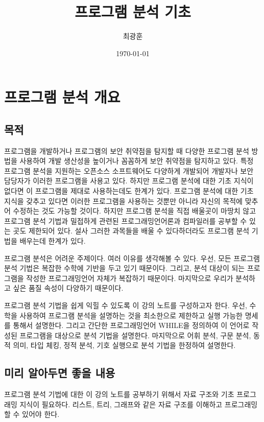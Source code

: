 \documentclass[a4paper]{book}
\title{프로그램 분석 기초}
\author{최광훈}
\date{\today}
\begin{document}
\maketitle

\chapter{프로그램 분석 개요}

\section{목적}

프로그램을 개발하거나 프로그램의 보안 취약점을 탐지할 때 다양한
프로그램 분석 방법을 사용하여 개발 생산성을 높이거나 꼼꼼하게 보안
취약점을 탐지하고 있다.
%
특정 프로그램 분석을 지원하는 오픈소스 소프트웨어도 다양하게 개발되어
개발자나 보안 담당자가 이러한 프로그램을 사용고 있다. 하지만 프로그램
분석에 대한 기초 지식이 없다면 이 프로그램을 제대로 사용하는데도
한계가 있다. 프로그램 분석에 대한 기초 지식을 갖추고 있다면 이러한
프로그램을 사용하는 것뿐만 아니라 자신의 목적에 맞추어 수정하는 것도
가능할 것이다.
%
하지만 프로그램 분석을 직접 배울곳이 마땅치 않고 프로그램 분석 기법과
밀접하게 관련된 프로그래밍언어론과 컴파일러를 공부할 수 있는 곳도
제한되어 있다. 설사 그러한 과목들을 배울 수 있다하더라도 프로그램 분석
기법을 배우는데 한계가 있다.

프로그램 분석은 어려운 주제이다. 여러 이유를 생각해볼 수 있다. 우선,
모든 프로그램 분석 기법은 복잡한 수학에 기반을 두고 있기
때문이다. 그리고, 분석 대상이 되는 프로그램을 작성한 프로그래밍언어
자체가 복잡하기 때문이다. 마지막으로 우리가 분석하고 싶은 품질 속성이
다양하기 때문이다.

프로그램 분석 기법을 쉽게 익힐 수 있도록 이 강의 노트를 구성하고자
한다. 우선, 수학을 사용하여 프로그램 분석을 설명하는 것을 최소한으로
제한하고 실행 가능한 명세를 통해서 설명한다. 그리고 간단한
프로그래밍언어 WHILE을 정의하여 이 언어로 작성된 프로그램을 대상으로
분석 기법을 설명한다. 마지막으로 어휘 분석, 구문 분석, 동적 의미, 타입
체킹, 정적 분석, 기호 실행으로 분석 기법을 한정하여 설명한다.

\section{미리 알아두면 좋을 내용}

프로그램 분석 기법에 대한 이 강의 노트를 공부하기 위해서 자료 구조와
기초 프로그래밍 지식이 필요하다. 리스트, 트리, 그래프와 같은 자료
구조를 이해하고 프로그래밍할 수 있어야 한다.
\end{document}
